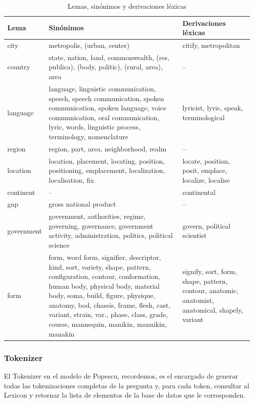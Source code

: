 \begin{center}
\begin{table}[h]
\centering
\begin{tabular}{| l |  p{9.5cm} | p{4cm} |} \hline
Lema & Sinónimos & Derivaciones léxicas\\ \hline
city 	&	metropolis, (urban, center)	&	citify, metropolitan\\ \hline
country	&	state, nation, land, commonwealth, (res, publica), (body, politic), (rural, area), area	&	--\\ \hline
language	&	language, linguistic communication, speech, speech communication, spoken communication, spoken language, voice communication, oral communication, lyric, words, linguistic process, terminology, nomenclature & lyricist, lyric, speak, terminological \\ \hline
region	&	region, part, area, neighborhood, realm	&	--\\ \hline
location	&	location, placement, locating, position, positioning, emplacement, localization, localisation, fix	&	locate, position, posit, emplace, localize, localise\\ \hline
continent	&	--	&	continental\\ \hline
gnp	&	gross national product	&	--\\ \hline
government	&	government, authorities, regime, governing, governance, government activity, administration, politics, political science	&	govern, political scientist\\ \hline
form	&	form, word form, signifier, descriptor, kind, sort, variety, shape, pattern, configuration, contour, conformation, human body, physical body, material body, soma, build, figure, physique, anatomy, bod, chassis, frame, flesh, cast, variant, strain, var., phase, class, grade, course, mannequin, manikin, mannikin, manakin	&	signify, sort, form, shape, pattern, contour, anatomic, anatomist, anatomical, shapely, variant\\ \hline
\end{tabular}
\caption{Lemas, sinónimos y derivaciones léxicas}
\label{table:sinonimos}
\end{table}
\end{center}

\subsubsection*{Tokenizer}
\label{subsubsec:tokenizer}

El Tokenizer en el modelo de Popescu, recordemos, es el encargado de generar todas las tokenizaciones completas de la pregunta y, para cada token, consultar al Lexicon y retornar la lista de elementos de la base de datos que le corresponden.

